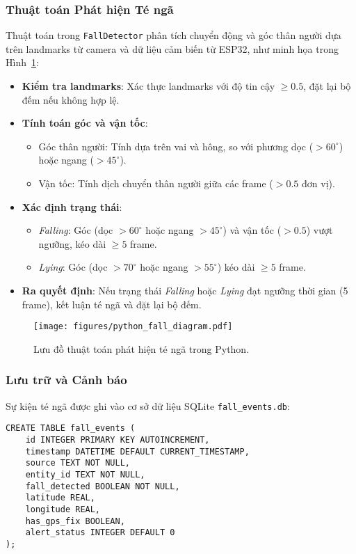 \subsubsection{Thuật toán Phát hiện Té ngã}
\label{subsubsec:fall_detection_algorithm}

Thuật toán trong \texttt{FallDetector} phân tích chuyển động và góc thân người dựa trên landmarks từ camera và dữ liệu cảm biến từ ESP32, như minh họa trong Hình~\ref{fig:python_fall_diagram}:
\begin{itemize}
    \item \textbf{Kiểm tra landmarks}: Xác thực landmarks với độ tin cậy $\geq 0.5$, đặt lại bộ đếm nếu không hợp lệ.
    \item \textbf{Tính toán góc và vận tốc}:
        \begin{itemize}
            \item Góc thân người: Tính dựa trên vai và hông, so với phương dọc ($>60^\circ$) hoặc ngang ($>45^\circ$).
            \item Vận tốc: Tính dịch chuyển thân người giữa các frame ($>0.5$ đơn vị).
        \end{itemize}
    \item \textbf{Xác định trạng thái}:
        \begin{itemize}
            \item \textit{Falling}: Góc (dọc $>60^\circ$ hoặc ngang $>45^\circ$) và vận tốc ($>0.5$) vượt ngưỡng, kéo dài $\geq 5$ frame.
            \item \textit{Lying}: Góc (dọc $>70^\circ$ hoặc ngang $>55^\circ$) kéo dài $\geq 5$ frame.
        \end{itemize}
    \item \textbf{Ra quyết định}: Nếu trạng thái \textit{Falling} hoặc \textit{Lying} đạt ngưỡng thời gian (5 frame), kết luận té ngã và đặt lại bộ đếm.
\end{itemize}

\begin{figure}[H]
\centering
\texttt{[image: figures/python\_fall\_diagram.pdf]}
\caption{Lưu đồ thuật toán phát hiện té ngã trong Python.}
\label{fig:python_fall_diagram}
\end{figure}

\subsubsection{Lưu trữ và Cảnh báo}
\label{subsubsec:data_storage_alerts}

Sự kiện té ngã được ghi vào cơ sở dữ liệu SQLite \texttt{fall\_events.db}:

\begin{verbatim}
CREATE TABLE fall_events (
    id INTEGER PRIMARY KEY AUTOINCREMENT,
    timestamp DATETIME DEFAULT CURRENT_TIMESTAMP,
    source TEXT NOT NULL,
    entity_id TEXT NOT NULL,
    fall_detected BOOLEAN NOT NULL,
    latitude REAL,
    longitude REAL,
    has_gps_fix BOOLEAN,
    alert_status INTEGER DEFAULT 0
);
\end{verbatim}

